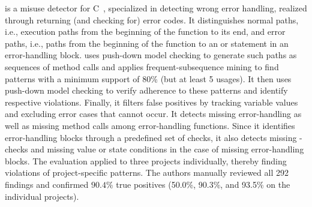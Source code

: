 \AX is a misuse detector for C~\cite{AX09}, specialized in detecting wrong error handling, realized through returning (and checking for) error codes.
It distinguishes normal paths, i.e., execution paths from the beginning of the  function to its end, and error paths, i.e., paths from the beginning of the  function to an  or  statement in an error-handling block.
\AX uses push-down model checking to generate such paths as sequences of method calls and applies frequent-subsequence mining to find patterns with a minimum support of 80\% (but at least 5 usages).
It then uses push-down model checking to verify adherence to these patterns and identify respective violations.
Finally, it filters false positives by tracking variable values and excluding error cases that cannot occur.
It detects missing error-handling as well as missing method calls among error-handling functions.
Since it identifies error-handling blocks through a predefined set of checks, it also detects missing -checks and missing value or state conditions in the case of missing error-handling blocks.
The evaluation applied \AX to three projects individually, thereby finding violations of project-specific patterns.
The authors manually reviewed all 292 findings and confirmed $90.4\%$ true positives (50.0\%, 90.3\%, and 93.5\% on the individual projects).

\vspace{0.03in}

